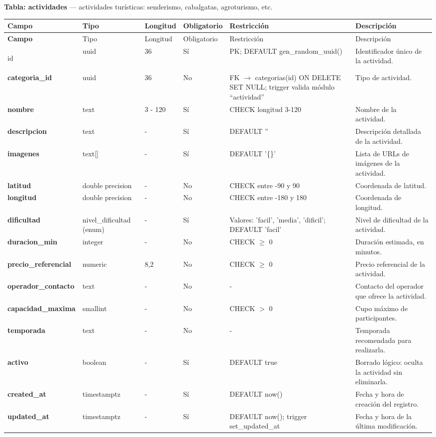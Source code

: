 \bigskip
\noindent\textbf{Tabla: actividades} — actividades turísticas: senderismo, cabalgatas, agroturismo, etc.

{\footnotesize
\begin{longtable}{|>{\bfseries}p{3.3cm}|p{2.6cm}|p{1.2cm}|p{1.6cm}|p{2.8cm}|p{4.0cm}|}
\hline
Campo & Tipo & Longitud & Obligatorio & Restricción & Descripción \\ \hline
\endfirsthead
\hline
Campo & Tipo & Longitud & Obligatorio & Restricción & Descripción \\ \hline
\endhead
\hline
\endfoot
\hline
\endlastfoot

id & uuid & 36 & Sí & PK; DEFAULT gen\_random\_uuid() & Identificador único de la actividad. \\ \hline
categoria\_id & uuid & 36 & No & FK $\rightarrow$ categorias(id) ON DELETE SET NULL; trigger valida módulo ``actividad'' & Tipo de actividad. \\ \hline
nombre & text & 3 - 120 & Sí & CHECK longitud 3-120 & Nombre de la actividad. \\ \hline
descripcion & text & - & Sí & DEFAULT '' & Descripción detallada de la actividad. \\ \hline
imagenes & text[] & - & Sí & DEFAULT '\{\}' & Lista de URLs de imágenes de la actividad. \\ \hline
latitud & double precision & - & No & CHECK entre -90 y 90 & Coordenada de latitud. \\ \hline
longitud & double precision & - & No & CHECK entre -180 y 180 & Coordenada de longitud. \\ \hline
dificultad & nivel\_dificultad (enum) & - & Sí & Valores: 'facil', 'media', 'dificil'; DEFAULT 'facil' & Nivel de dificultad de la actividad. \\ \hline
duracion\_min & integer & - & No & CHECK $\geq$ 0 & Duración estimada, en minutos. \\ \hline
precio\_referencial & numeric & 8,2 & No & CHECK $\geq$ 0 & Precio referencial de la actividad. \\ \hline
operador\_contacto & text & - & No & - & Contacto del operador que ofrece la actividad. \\ \hline
capacidad\_maxima & smallint & - & No & CHECK $>$ 0 & Cupo máximo de participantes. \\ \hline
temporada & text & - & No & - & Temporada recomendada para realizarla. \\ \hline
activo & boolean & - & Sí & DEFAULT true & Borrado lógico: oculta la actividad sin eliminarla. \\ \hline
created\_at & timestamptz & - & Sí & DEFAULT now() & Fecha y hora de creación del registro. \\ \hline
updated\_at & timestamptz & - & Sí & DEFAULT now(); trigger set\_updated\_at & Fecha y hora de la última modificación. \\ \hline
\end{longtable}
}


